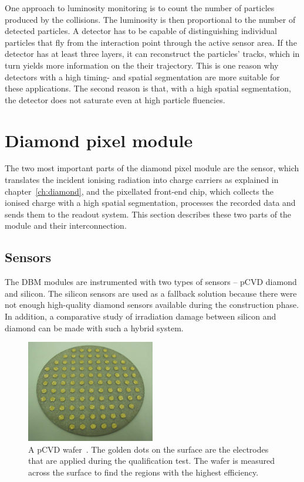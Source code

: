One approach to luminosity monitoring is to count the number of particles produced by the collisions. The luminosity is then proportional to the number of detected particles. A detector has to be capable of distinguishing individual particles that fly from the interaction point through the active sensor area. If the detector has at least three layers, it can reconstruct the particles' tracks, which in turn yields more information on the their trajectory. This is one reason why detectors with a high timing- and spatial segmentation are more suitable for these applications. The second reason is that, with a high spatial segmentation, the detector does not saturate even at high particle fluencies.





\section{Diamond pixel module}
\label{sec:atlasdbm}
The two most important parts of the diamond pixel module are the sensor, which translates the incident ionising radiation into charge carriers as explained in chapter~\ref{ch:diamond}, and the pixellated front-end chip, which collects the ionised charge with a high spatial segmentation, processes the recorded data and sends them to the readout system. This section describes these two parts of the module and their interconnection.

\subsection{Sensors}
The DBM modules are instrumented with two types of sensors -- pCVD diamond and silicon. The silicon sensors are used as a fallback solution because there were not enough high-quality diamond sensors available during the construction phase. In addition, a comparative study of irradiation damage between silicon and diamond can be made with such a hybrid system.
\begin{figure}[!t]
\centering
\includegraphics[width=0.5\textwidth]{04_charge_monitoring/pics/wafer}
\caption{A pCVD wafer~\cite{RADSEN:00000}. The golden dots on the surface are the electrodes that are applied during the qualification test. The wafer is measured across the surface to find the regions with the highest efficiency.}
\label{fig:wafer}
\end{figure}

